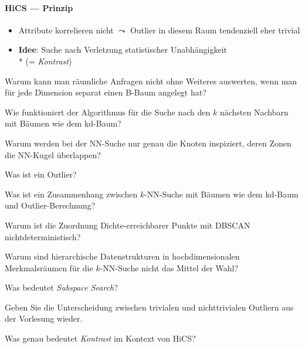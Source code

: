 \paragraph{HiCS --- Prinzip}
\begin{itemize}
	\item Attribute korrelieren nicht \( \leadsto \) Outlier in diesem Raum tendenziell eher trivial
	\item \textbf{Idee}: Suche nach Verletzung statistischer Unabhängigkeit \\* (= \emph{Kontrast})
\end{itemize}

\begin{fragen}
	\item Warum kann man räumliche Anfragen nicht ohne Weiteres auswerten, wenn man für jede Dimension separat einen B-Baum angelegt hat?
	\item Wie funktioniert der Algorithmus für die Suche nach den \( k \) nächsten Nachbarn mit Bäumen wie dem kd-Baum?
	\item Warum werden bei der NN-Suche nur genau die Knoten inspiziert, deren Zonen die NN-Kugel überlappen?
	\item Was ist ein Outlier?
	\item Was ist ein Zusammenhang zwischen \( k \)-NN-Suche mit Bäumen wie dem kd-Baum und Outlier-Berechnung?
	\item Warum ist die Zuordnung Dichte-erreichbarer Punkte mit DBSCAN nichtdeterministisch?
	\item Warum sind hierarchische Datenstrukturen in hochdimensionalen Merkmalsräumen für die \( k \)-NN-Suche nicht das Mittel der Wahl?
	\item Was bedeutet \emph{Subspace Search}?
	\item Geben Sie die Unterscheidung zwischen trivialen und nichttrivialen Outliern aus der Vorlesung wieder.
	\item Was genau bedeutet \emph{Kontrast} im Kontext von HiCS?
\end{fragen}
